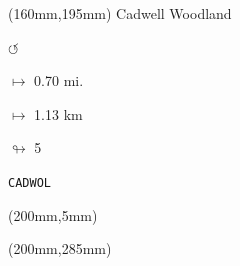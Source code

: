 \begin{textblock*}{40mm}(160mm,195mm)%
Cadwell Woodland
\par \Huge$\circlearrowleft$
\Large
\par$\mapsto$ 0.70 mi.
\par$\mapsto$ 1.13 km
\par$\looparrowright$ 5
\par\hfill\tiny\tt CADWOL\\
\end{textblock*}
\begin{textblock*}{20mm}(200mm,5mm)%
\fbox{\thepage}
\end{textblock*}
\begin{textblock*}{20mm}(200mm,285mm)%
\fbox{\thepage}
\end{textblock*}
\null\newpage

